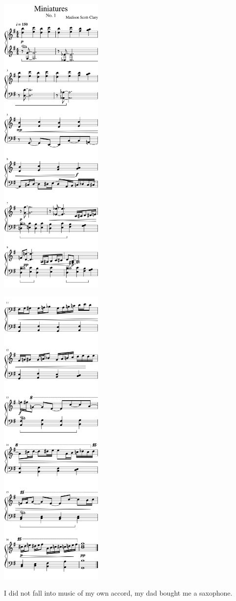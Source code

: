 \label{writing:music}
\begin{paracol}{2}
\begin{rightcolumn*}
\noindent\includegraphics[width=2in]{assets/static/miniatures/1-1.png}

\noindent\includegraphics[width=2in]{assets/static/miniatures/1-2.png}
\end{rightcolumn*}
\begin{leftcolumn}
  \noindent I did not fall into music of my own accord, my dad bought me a saxophone.


\end{leftcolumn}
\end{paracol}
